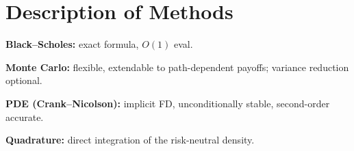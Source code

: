 \documentclass[a4paper,11pt]{article}
\begin{document}
\section{Description of Methods}

\textbf{Black–Scholes:} exact formula, $O(1)$ eval.  

\textbf{Monte Carlo:} flexible, extendable to path-dependent payoffs; variance reduction optional.  

\textbf{PDE (Crank–Nicolson):} implicit FD, unconditionally stable, second-order accurate.  

\textbf{Quadrature:} direct integration of the risk-neutral density.
\end{document}
